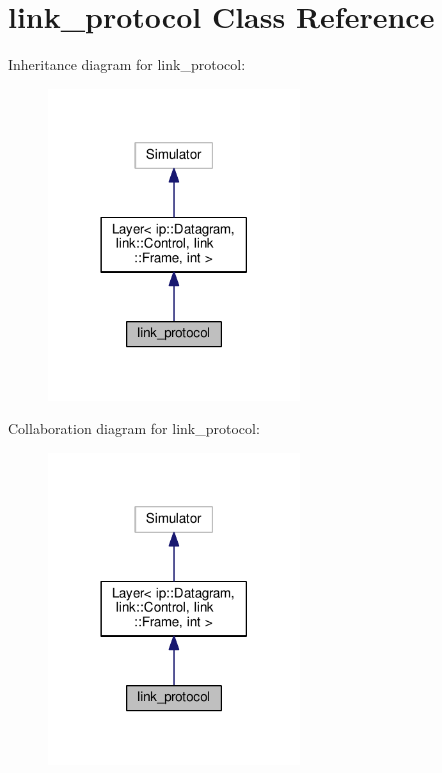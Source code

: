 \hypertarget{classlink__protocol}{}\section{link\+\_\+protocol Class Reference}
\label{classlink__protocol}


Inheritance diagram for link\+\_\+protocol\+:\nopagebreak
\begin{figure}[H]
\begin{center}
\leavevmode
\includegraphics[width=189pt]{classlink__protocol__inherit__graph}
\end{center}
\end{figure}


Collaboration diagram for link\+\_\+protocol\+:\nopagebreak
\begin{figure}[H]
\begin{center}
\leavevmode
\includegraphics[width=189pt]{classlink__protocol__coll__graph}
\end{center}
\end{figure}
